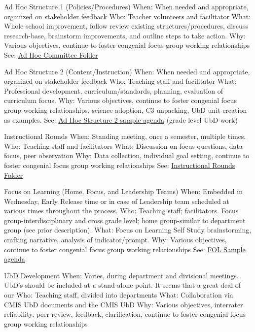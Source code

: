 \documentclass{report}
\begin{document}
\begin{findings}
Ad Hoc Structure 1 (Policies/Procedures)
When: When needed and appropriate, organized on stakeholder feedback
Who: Teacher volunteers and facilitator
What: Whole school improvement, follow review existing structures/procedures, discuss research-base, brainstorm improvements, and outline steps to take action. 
Why: Various objectives, continue to foster congenial focus group working relationships
See: \href{https://drive.google.com/drive/folders/0ByVFfrm0zfolfjVOamtmQjRQSkRwV0cyX3prVnJaV3g4cHFkS1c5dkEtZE1idS12ZWpRcXc?usp=sharing}{Ad Hoc Committee Folder}

Ad Hoc Structure 2 (Content/Instruction)
When: When needed and appropriate, organized on stakeholder feedback 
Who: Teaching staff and facilitator 
What: Professional development, curriculum/standards, planning, evaluation of curriculum focus.
Why: Various objectives, continue to foster congenial focus group working relationships, science adoption, C3 unpacking,  UbD unit creation as examples. 
See: \href{https://docs.google.com/a/cmis.ac.th/document/d/1PWUPZmm2vR4IJ7SX3x5nhWWZvAfZ6Krz9QMHi78HCNA/edit?usp=sharing}{Ad Hoc Structure 2 sample agenda} (grade level UbD work)

Instructional Rounds 
When: Standing meeting, once a semester, multiple times. 
Who: Teaching staff and facilitators 
What: Discussion on focus questions, data focus, peer observation
Why: Data collection, individual goal setting, continue to foster congenial focus group working relationships
See: \href{https://drive.google.com/drive/folders/0ByVFfrm0zfolQ3FRNWNSVmpCUUk?usp=sharing}{Instructional Rounds Folder}

Focus on Learning (Home, Focus, and Leadership Teams)
When: Embedded in Wednesday, Early Release time or in case of Leadership team scheduled at various times throughout the process.
Who: Teaching staff; facilitators.  Focus group-interdisciplinary and cross grade level; home group-similar to department group (see prior description).
What: Focus on Learning Self Study brainstorming, crafting narrative, analysis of indicator/prompt.
Why: Various objectives, continue to foster congenial focus group working relationships
See: \href{https://docs.google.com/a/cmis.ac.th/document/d/16YqTcAhgTRg8LaIyVsV3moEB8PXdObg2IW2e_7fB3Fk/edit?usp=sharing}{FOL Sample agenda}

UbD Development
When: Varies, during department and divisional meetings. UbD’s should be included at a stand-alone point. It seems that a great deal of our 
Who: Teaching staff, divided into departments 
What: Collaboration via CMIS UbD documents and the CMIS UbD 
Why: Various objectives, interrater reliability, peer review, feedback, clarification, continue to foster congenial focus group working relationships


\end{findings}
\end{document}
